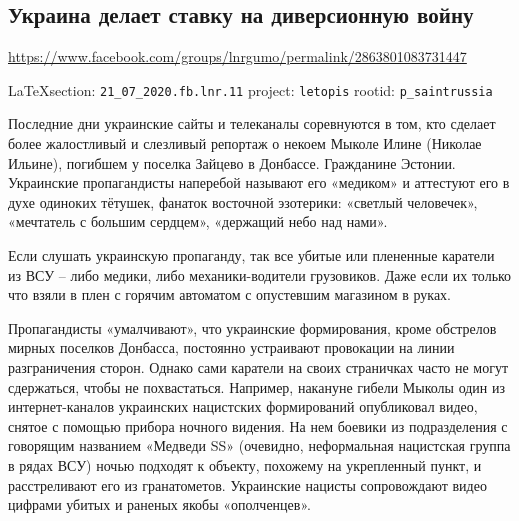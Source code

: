  
 

\subsection{Украина делает ставку на диверсионную войну}
\url{https://www.facebook.com/groups/lnrgumo/permalink/2863801083731447}
  
\vspace{0.5cm}
{\small\LaTeX section: \verb|21_07_2020.fb.lnr.11| project: \verb|letopis| rootid: \verb|p_saintrussia|}
\vspace{0.5cm}



Последние дни украинские сайты и телеканалы соревнуются в том, кто сделает
более жалостливый и слезливый репортаж о некоем Мыколе Илине (Николае Ильине),
погибшем у поселка Зайцево в Донбассе. Гражданине Эстонии. Украинские
пропагандисты наперебой называют его «медиком» и аттестуют его в духе одиноких
тётушек, фанаток восточной эзотерики: «светлый человечек», «мечтатель с большим
сердцем», «держащий небо над нами».

Если слушать украинскую пропаганду, так все убитые или плененные каратели из
ВСУ – либо медики, либо механики-водители грузовиков. Даже если их только что
взяли в плен с горячим автоматом с опустевшим магазином в руках.

Пропагандисты «умалчивают», что украинские формирования, кроме обстрелов мирных
поселков Донбасса, постоянно устраивают провокации на линии разграничения
сторон. Однако сами каратели на своих страничках часто не могут сдержаться,
чтобы не похвастаться. Например, накануне гибели Мыколы один из
интернет-каналов украинских нацистских формирований опубликовал видео, снятое с
помощью прибора ночного видения. На нем боевики из подразделения с говорящим
названием «Медведи SS» (очевидно, неформальная нацистская группа в рядах ВСУ)
ночью подходят к объекту, похожему на укрепленный пункт, и расстреливают его из
гранатометов. Украинские нацисты сопровождают видео цифрами убитых и раненых
якобы «ополченцев».

